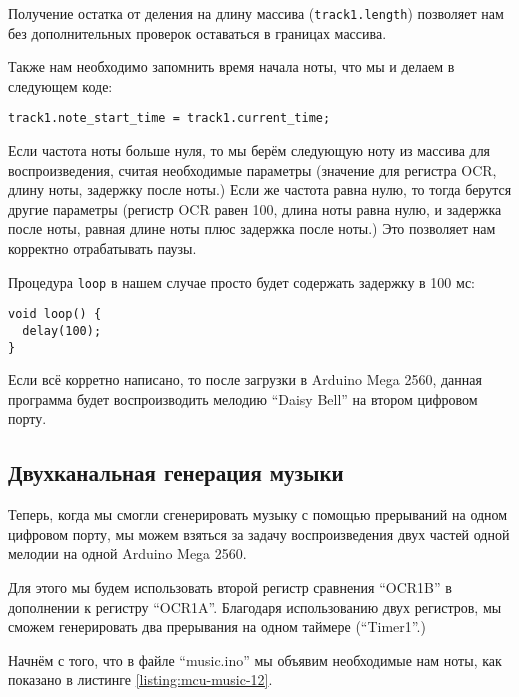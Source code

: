 \documentclass[../sparc.tex]{subfiles}
\begin{document}
Получение остатка от деления на длину массива (\texttt{track1.length})
позволяет нам без дополнительных проверок оставаться в границах массива.

Также нам необходимо запомнить время начала ноты, что мы и делаем в следующем
коде:

\begin{verbatim}
track1.note_start_time = track1.current_time;
\end{verbatim}

Если частота ноты больше нуля, то мы берём следующую ноту из массива для
воспроизведения, считая необходимые параметры (значение для регистра OCR, длину
ноты, задержку после ноты.)  Если же частота равна нулю, то тогда берутся другие
параметры (регистр OCR равен 100, длина ноты равна нулю, и задержка после ноты,
равная длине ноты плюс задержка после ноты.)  Это позволяет нам корректно
отрабатывать паузы.

Процедура \texttt{loop} в нашем случае просто будет содержать задержку
в 100 мс:

\begin{verbatim}
void loop() {
  delay(100);
}
\end{verbatim}

Если всё корретно написано, то после загрузки в Arduino Mega 2560, данная
программа будет воспроизводить мелодию ``Daisy Bell'' на втором цифровом порту.

\newpage
\subsection{Двухканальная генерация музыки}

Теперь, когда мы смогли сгенерировать музыку с помощью прерываний на одном
цифровом порту, мы можем взяться за задачу воспроизведения двух частей одной
мелодии на одной Arduino Mega 2560.

Для этого мы будем использовать второй регистр сравнения ``OCR1B'' в дополнении
к регистру ``OCR1A''.  Благодаря использованию двух регистров, мы сможем
генерировать два прерывания на одном таймере (``Timer1''.)

Начнём с того, что в файле ``music.ino'' мы объявим необходимые нам ноты, как
показано в листинге \ref{listing:mcu-music-12}.
\end{document}
